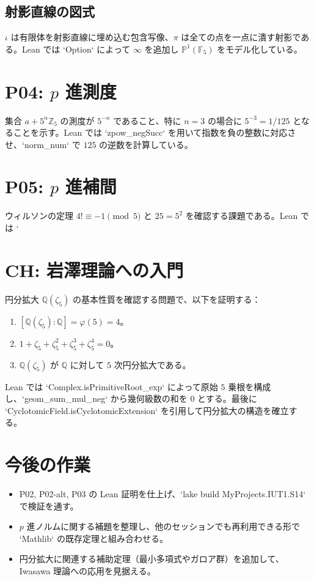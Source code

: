 \documentclass[a4paper]{ltjsarticle}
\begin{document}
\subsection*{射影直線の図式}
\begin{center}
\end{center}
$
\iota$ は有限体を射影直線に埋め込む包含写像、$\pi$ は全ての点を一点に潰す射影である。Lean では `Option` によって $\infty$ を追加し $\mathbb{P}^1(\mathbb{F}_5)$ をモデル化している。

\section{P04: $p$ 進測度}
集合 $a + 5^n\mathbb{Z}_5$ の測度が $5^{-n}$ であること、特に $n=3$ の場合に $5^{-3} = 1/125$ となることを示す。Lean では `zpow_negSucc` を用いて指数を負の整数に対応させ、`norm_num` で $125$ の逆数を計算している。

\section{P05: $p$ 進補間}
ウィルソンの定理 $4! \equiv -1 \pmod 5$ と $25 = 5^2$ を確認する課題である。Lean では `%

\section{CH: 岩澤理論への入門}
円分拡大 $\mathbb{Q}(\zeta_5)$ の基本性質を確認する問題で、以下を証明する：
\begin{enumerate}
  \item $[\mathbb{Q}(\zeta_5):\mathbb{Q}] = \varphi(5) = 4$。
  \item $1 + \zeta_5 + \zeta_5^2 + \zeta_5^3 + \zeta_5^4 = 0$。
  \item $\mathbb{Q}(\zeta_5)$ が $\mathbb{Q}$ に対して $5$ 次円分拡大である。
\end{enumerate}
Lean では `Complex.isPrimitiveRoot_exp` によって原始 $5$ 乗根を構成し、`geom_sum_mul_neg` から幾何級数の和を $0$ とする。最後に `CyclotomicField.isCyclotomicExtension` を引用して円分拡大の構造を確立する。

\section{今後の作業}
\begin{itemize}
  \item P02, P02-alt, P03 の Lean 証明を仕上げ、`lake build MyProjects.IUT1.S14` で検証を通す。
  \item $p$ 進ノルムに関する補題を整理し、他のセッションでも再利用できる形で `Mathlib` の既存定理と組み合わせる。
  \item 円分拡大に関連する補助定理（最小多項式やガロア群）を追加して、Iwasawa 理論への応用を見据える。
\end{itemize}
\end{document}
